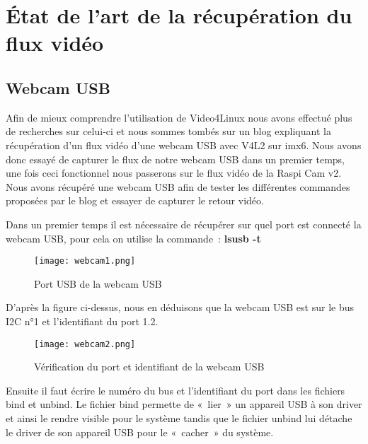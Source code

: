
\chapter{État de l'art de la récupération du flux vidéo} %

\label{Chapter5} %


\section{Webcam USB}

Afin de mieux comprendre l’utilisation de Video4Linux nous avons effectué plus de
recherches sur celui-ci et nous sommes tombés sur un blog expliquant la récupération d’un
flux vidéo d’une webcam USB avec V4L2 sur imx6. Nous avons donc essayé de capturer le flux
de notre webcam USB dans un premier temps, une fois ceci fonctionnel nous passerons sur le
flux vidéo de la Raspi Cam v2. Nous avons récupéré une webcam USB afin de tester les
différentes commandes proposées par le blog et essayer de capturer le retour vidéo.

Dans un premier temps il est nécessaire de récupérer sur quel port est connecté la
webcam USB, pour cela on utilise la commande : \textbf{lsusb -t}

\begin{figure}[th]
    \centering
    \texttt{[image: webcam1.png]}
    \decoRule
    \caption{Port USB de la webcam USB}  \label{fig:webcam1}   
\end{figure}

D’après la figure ci-dessus, nous en déduisons que la webcam USB est sur le bus
I2C n°1 et l’identifiant du port 1.2.

\begin{figure}[th]
    \centering
    \texttt{[image: webcam2.png]}
    \decoRule
    \caption{Vérification du port et identifiant de la webcam USB}  \label{fig:webcam2}   
\end{figure}

Ensuite il faut écrire le numéro du bus et l’identifiant du port dans les fichiers
bind et unbind. Le fichier bind permette de  « lier » un appareil USB à son driver et
ainsi le rendre visible pour le système tandis que le fichier unbind lui détache le driver
de son appareil USB pour le « cacher » du système.

